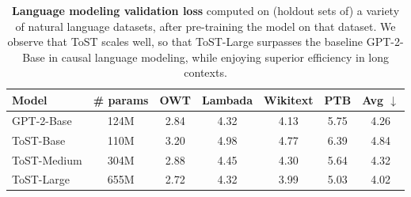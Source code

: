 \documentclass[../../book-main.tex]{subfiles}
\begin{document}
\begin{table}[!htbp]
    \centering 
    \begin{tabular}{@{}lcccccc@{}}
        \toprule
        Model & \# params & OWT & Lambada & Wikitext & PTB & Avg $\downarrow$ \\ \midrule
        GPT-2-Base & 124M & 2.84 & 4.32 & 4.13 & 5.75 & 4.26 \\
        ToST-Base & 110M & 3.20 & 4.98 & 4.77 & 6.39 & 4.84 \\
        ToST-Medium & 304M & 2.88 & 4.45 & 4.30 & 5.64 & 4.32 \\
        ToST-Large & 655M & 2.72 & 4.32 & 3.99 & 5.03 & 4.02 \\ \bottomrule
    \end{tabular}%
    \caption{\small\textbf{Language modeling validation loss} computed on (holdout sets of) a variety of natural language datasets, after pre-training the model on that dataset. We observe that ToST scales well, so that ToST-Large surpasses the baseline GPT-2-Base in causal language modeling, while enjoying superior efficiency in long contexts.}
    \label{tab:tost_lm}
\end{table}
\end{document}
